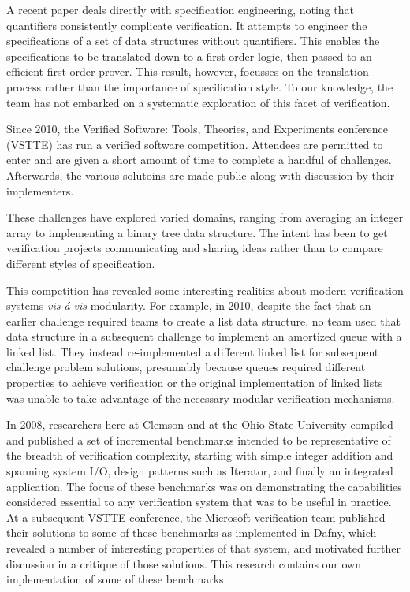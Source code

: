 A recent paper\cite{bouillaguetJahobFirstOrder} deals directly with specification engineering, noting that quantifiers consistently complicate verification.  It attempts to engineer the specifications of a set of data structures without quantifiers.  This enables the specifications to be translated down to a first-order logic, then passed to an efficient first-order prover.  This result, however, focusses on the translation process rather than the importance of specification style.  To our knowledge, the team has not embarked on a systematic exploration of this facet of verification.

Since 2010, the Verified Software: Tools, Theories, and Experiments conference (VSTTE) has run a verified software competition.  Attendees are permitted to enter and are given a short amount of time to complete a handful of challenges.  Afterwards, the various solutoins are made public along with discussion by their implementers.

These challenges have explored varied domains, ranging from averaging an integer array to implementing a binary tree data structure.  The intent has been to get verification projects communicating and sharing ideas rather than to compare different styles of specification.  

This competition has revealed some interesting realities about modern verification systems \emph{vis-\'{a}-vis} modularity.  For example, in 2010, despite the fact that an earlier challenge required teams to create a list data structure, no team used that data structure in a subsequent challenge to implement an amortized queue with a linked list.  They instead re-implemented a different linked list for subsequent challenge problem solutions, presumably because queues required different properties to achieve verification or the original implementation of linked lists was unable to take advantage of the necessary modular verification mechanisms.

In 2008, researchers here at Clemson and at the Ohio State University compiled and published\cite{Benchmarks} a set of incremental benchmarks intended to be representative of the breadth of verification complexity, starting with simple integer addition and spanning system I/O, design patterns such as Iterator, and finally an integrated application.  The focus of these benchmarks was on demonstrating the capabilities considered essential to any verification system that was to be useful in practice.  At a subsequent VSTTE conference, the Microsoft verification team published their solutions to some of these benchmarks as implemented in Dafny\cite{DafnySolutions}, which revealed a number of interesting properties of that system, and motivated further discussion in a critique of those solutions\cite{bronish2010review}.  This research contains our own implementation of some of these benchmarks.
